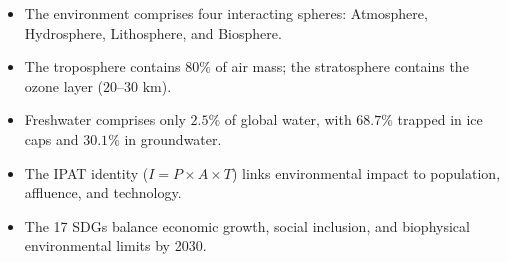 \begin{quickrevision}
\begin{itemize}[leftmargin=1.2em]
    \item The environment comprises four interacting spheres: Atmosphere, Hydrosphere, Lithosphere, and Biosphere.
    \item The troposphere contains $80\%$ of air mass; the stratosphere contains the ozone layer ($20\text{--}30\text{ km}$).
    \item Freshwater comprises only $2.5\%$ of global water, with $68.7\%$ trapped in ice caps and $30.1\%$ in groundwater.
    \item The IPAT identity ($I = P \times A \times T$) links environmental impact to population, affluence, and technology.
    \item The 17 SDGs balance economic growth, social inclusion, and biophysical environmental limits by 2030.
\end{itemize}
\end{quickrevision}
